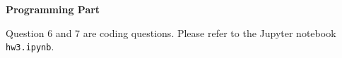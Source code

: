 \documentclass{article}
\begin{document}
\begin{probset}
\newpage

\fontsize{12pt}{\baselineskip}\selectfont\textbf{Programming Part}

Question 6 and 7 are coding questions. Please refer to the Jupyter notebook \texttt{hw3.ipynb}.

\begin{prob}\end{prob}

\begin{prob}\end{prob}
\end{probset}
\end{document}
